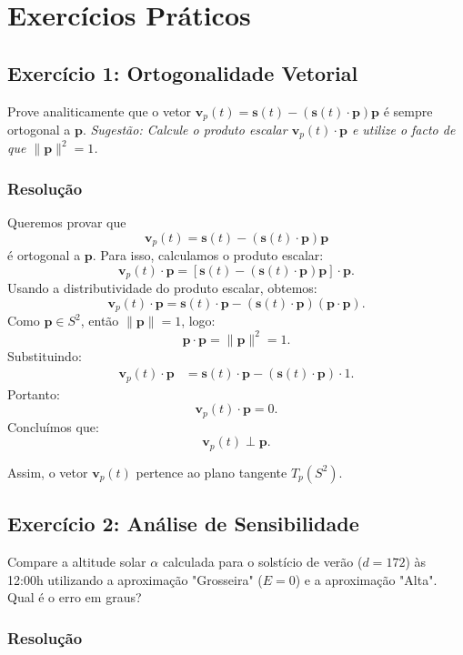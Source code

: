 \documentclass[12pt,a4paper]{report}
\begin{document}
\chapter{Exercícios Práticos}

\section{Exercício 1: Ortogonalidade Vetorial}
Prove analiticamente que o vetor $\mathbf{v}_p(t) = \mathbf{s}(t) - (\mathbf{s}(t) \cdot \mathbf{p})\mathbf{p}$ é sempre ortogonal a $\mathbf{p}$. 
\textit{Sugestão: Calcule o produto escalar $\mathbf{v}_p(t) \cdot \mathbf{p}$ e utilize o facto de que $\|\mathbf{p}\|^2 = 1$.}

\subsection{Resolução}
Queremos provar que
\[
\mathbf{v}_p(t)=\mathbf{s}(t)-(\mathbf{s}(t)\cdot \mathbf{p})\mathbf{p}
\]
é ortogonal a \(\mathbf{p}\).
Para isso, calculamos o produto escalar:
\[
\mathbf{v}_p(t)\cdot \mathbf{p}
=\left[\mathbf{s}(t)-(\mathbf{s}(t)\cdot \mathbf{p})\mathbf{p}\right]\cdot \mathbf{p}.
\]
Usando a distributividade do produto escalar, obtemos:
\[
\mathbf{v}_p(t)\cdot \mathbf{p}
=\mathbf{s}(t)\cdot \mathbf{p}
-(\mathbf{s}(t)\cdot \mathbf{p})(\mathbf{p}\cdot \mathbf{p}).
\]
Como \(\mathbf{p}\in S^2\), então \(\|\mathbf{p}\|=1\), logo:
\[
\mathbf{p}\cdot \mathbf{p}=\|\mathbf{p}\|^2=1.
\]
Substituindo:
\[
\begin{aligned}
\mathbf{v}_p(t)\cdot \mathbf{p}
&=\mathbf{s}(t)\cdot \mathbf{p}
-(\mathbf{s}(t)\cdot \mathbf{p})\cdot 1.
\end{aligned}
\]
Portanto:
\[
\mathbf{v}_p(t)\cdot \mathbf{p}=0.
\]
Concluímos que:
\[
\mathbf{v}_p(t)\perp \mathbf{p}.
\]

Assim, o vetor \(\mathbf{v}_p(t)\) pertence ao plano tangente \(T_p(S^2)\).
\newpage
\section{Exercício 2: Análise de Sensibilidade}
Compare a altitude solar $\alpha$ calculada para o solstício de verão ($d=172$) às 12:00h utilizando a aproximação "Grosseira" ($E=0$) e a aproximação "Alta". Qual é o erro em graus?

\subsection{Resolução}
\end{document}
